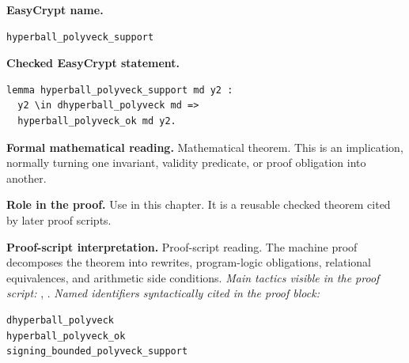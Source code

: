\begin{formaltheorem}
\noindent\textbf{EasyCrypt name.}
\begin{lstlisting}[language=EasyCrypt,basicstyle=\ttfamily\scriptsize]
hyperball_polyveck_support
\end{lstlisting}
\noindent\textbf{Checked EasyCrypt statement.}
\begin{lstlisting}[language=EasyCrypt,basicstyle=\ttfamily\scriptsize]
lemma hyperball_polyveck_support md y2 :
  y2 \in dhyperball_polyveck md =>
  hyperball_polyveck_ok md y2.
\end{lstlisting}
\noindent\textbf{Formal mathematical reading.}
Mathematical theorem. This is an implication, normally turning one invariant, validity predicate, or proof obligation into another.

\noindent\textbf{Role in the proof.}
Use in this chapter. It is a reusable checked theorem cited by later proof scripts.

\noindent\textbf{Proof-script interpretation.}
Proof-script reading. The machine proof decomposes the theorem into rewrites, program-logic obligations, relational equivalences, and arithmetic side conditions.
\emph{Main tactics visible in the proof script:} , .
\emph{Named identifiers syntactically cited in the proof block:}
\begin{lstlisting}[language=EasyCrypt,basicstyle=\ttfamily\scriptsize]
dhyperball_polyveck
hyperball_polyveck_ok
signing_bounded_polyveck_support
\end{lstlisting}

\end{formaltheorem}


